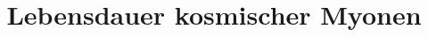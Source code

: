 

\subject{V01}
\title{Lebensdauer kosmischer Myonen}



\maketitle

\thispagestyle{empty}


\newpage

\tableofcontents
\newpage






\nocite{*}
\newpage
\printbibliography{}


